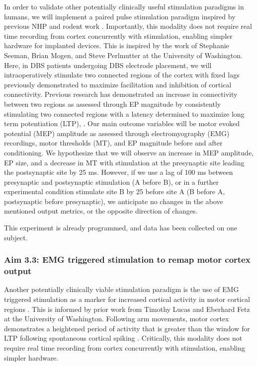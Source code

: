In order to validate other potentially clinically useful stimulation paradigms in humans, we will implement a paired pulse stimulation paradigm inspired by previous NHP and rodent work \cite{Seeman2017,Rebesco2010}. Importantly, this modality does not require real time recording from cortex concurrently with stimulation, enabling simpler hardware for implanted devices. This is inspired by the work of Stephanie Seeman, Brian Mogen, and Steve Perlmutter at the University of Washington. Here, in DBS patients undergoing DBS electrode placement, we will intraoperatively stimulate two connected regions of the cortex with fixed lags previously demonstrated to maximize facilitation and inhibition of cortical connectivity. Previous research has demonstrated an increase in connectivity between two regions as assessed through EP magnitude by consistently stimulating two connected regions with a latency determined to maximize long term potentiation (LTP),  \cite{Seeman2017}. Our main outcome variables will be motor evoked potential (MEP) amplitude as assessed through electromyography (EMG) recordings, motor thresholds (MT), and EP magnitude before and after conditioning. We hypothesize that we will observe an increase in MEP amplitude, EP size, and a decrease in MT with stimulation at the presynaptic site leading the postsynaptic site by 25 ms. However, if we use a lag of 100 ms between presynaptic and postsynaptic stimulation (A before B), or in a further experimental condition stimulate site B by 25 before site A (B before A, postsynaptic before presynaptic), we anticipate no changes in the above mentioned output metrics, or the opposite direction of changes. 

This experiment is already programmed, and data has been collected on one subject.  

\subsubsection{Aim 3.3: EMG triggered stimulation to remap motor cortex output}

Another potentially clinically viable stimulation paradigm is the use of EMG triggered stimulation as a marker for increased cortical activity in motor cortical regions \cite{Lucas2013}. This is informed by prior work from Timothy Lucas and Eberhard Fetz at the University of Washington. Following arm movements, motor cortex demonstrates a heightened period of activity that is greater than the window for LTP following spontaneous cortical spiking \cite{Edwardson2013,Crammond2000}. Critically, this modality does not require real time recording from cortex concurrently with stimulation, enabling simpler hardware. 

